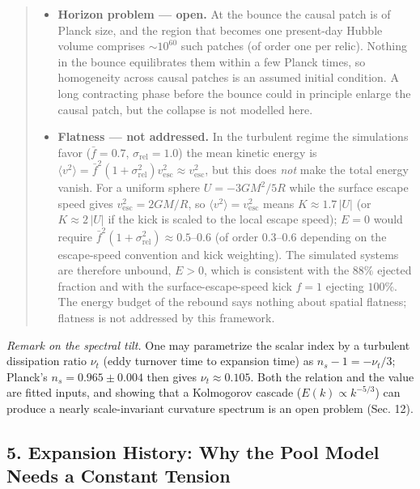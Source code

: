 \documentclass[
]{article}
\providecommand{\tightlist}{%
  \setlength{\itemsep}{0pt}\setlength{\parskip}{0pt}}
\begin{document}
\begin{quote}
\begin{itemize}
\tightlist
\item
  \textbf{Horizon problem --- open.} At the bounce the causal patch is
  of Planck size, and the region that becomes one present-day Hubble
  volume comprises \(\sim\!10^{60}\) such patches (of order one per
  relic). Nothing in the bounce equilibrates them within a few Planck
  times, so homogeneity across causal patches is an assumed initial
  condition. A long contracting phase before the bounce could in
  principle enlarge the causal patch, but the collapse is not modelled
  here.
\item
  \textbf{Flatness --- not addressed.} In the turbulent regime the
  simulations favor (\(\bar{f} = 0.7\), \(\sigma_{\text{rel}} = 1.0\))
  the mean kinetic energy is
  \(\langle v^2\rangle = \bar{f}^2(1+\sigma_{\text{rel}}^2)v_{\text{esc}}^2 \approx v_{\text{esc}}^2\),
  but this does \emph{not} make the total energy vanish. For a uniform
  sphere \(U = -3GM^2/5R\) while the surface escape speed gives
  \(v_{\text{esc}}^2 = 2GM/R\), so
  \(\langle v^2\rangle = v_{\text{esc}}^2\) means \(K \approx 1.7\,|U|\)
  (or \(K \approx 2\,|U|\) if the kick is scaled to the local escape
  speed); \(E = 0\) would require
  \(\bar{f}^2(1+\sigma_{\text{rel}}^2) \approx 0.5\)--\(0.6\) (of order
  \(0.3\)--\(0.6\) depending on the escape-speed convention and kick
  weighting). The simulated systems are therefore unbound, \(E > 0\),
  which is consistent with the \(88\%\) ejected fraction and with the
  surface-escape-speed kick \(f = 1\) ejecting \(100\%\). The energy
  budget of the rebound says nothing about spatial flatness; flatness is
  not addressed by this framework.
\end{itemize}
\end{quote}

\emph{Remark on the spectral tilt.} One may parametrize the scalar index
by a turbulent dissipation ratio \(\nu_t\) (eddy turnover time to
expansion time) as \(n_s - 1 = -\nu_t/3\); Planck's
\(n_s = 0.965 \pm 0.004\) then gives \(\nu_t \approx 0.105\). Both the
relation and the value are fitted inputs, and showing that a Kolmogorov
cascade (\(E(k) \propto k^{-5/3}\)) can produce a nearly scale-invariant
curvature spectrum is an open problem (Sec. 12).

\hypertarget{expansion-history-why-the-pool-model-needs-a-constant-tension}{%
\subsection{\texorpdfstring{\textbf{5. Expansion History: Why the Pool
Model Needs a Constant
Tension}}{5. Expansion History: Why the Pool Model Needs a Constant Tension}}\label{expansion-history-why-the-pool-model-needs-a-constant-tension}}
\end{document}
